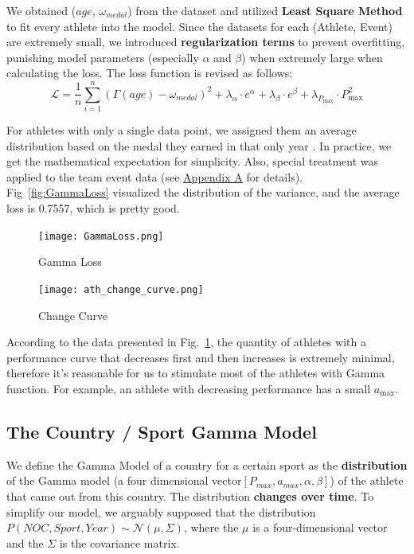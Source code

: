 \documentclass{mcmthesis}
\begin{document}
We obtained ($age$, $\omega_{medal}$) from the dataset and utilized \textbf{Least Square Method} to fit every athlete into the model. Since the datasets for each (Athlete, Event) are extremely small, we introduced \textbf{regularization terms} to prevent overfitting, punishing model parameters (especially $\alpha$ and $\beta$) when extremely large when calculating the loss. The loss function is revised as follows:
\[
\mathcal{L} = \frac{1}{n} \sum_{i=1}^n (\Gamma(age) - \omega_{medal})^2 + \lambda_\alpha \cdot e^{\alpha} + \lambda_\beta \cdot e^{\beta} + \lambda_{P_{\text{max}}} \cdot P_{\text{max}}^2
\]

For athletes with only a single data point, we assigned them an average distribution based on the medal they earned in that only year . In practice, we get the mathematical expectation for simplicity. Also, special treatment was applied to the team event data (see \hyperref[appA]{Appendix A} for details). Fig~\ref{fig:GammaLoss} visualized the distribution of the variance, and the average loss is 0.7557, which is pretty good.


\begin{figure}[htbp]
    \centering
    \begin{minipage}{0.48\textwidth}
        \centering
        \texttt{[image: GammaLoss.png]}
        \caption{Gamma Loss}
        \label{GammaLoss}
    \end{minipage}
    \hfill
    \begin{minipage}{0.48\textwidth}
        \centering
        \texttt{[image: ath\_change\_curve.png]}
        \caption{Change Curve}
        \label{ChangeCurve}
    \end{minipage}
\end{figure}

According to the data presented in Fig.~\ref{ChangeCurve}, the quantity of athletes with a performance curve that decreases first and then increases is extremely minimal, therefore it's reasonable for us to stimulate most of the athletes with Gamma function. For example, an athlete with decreasing performance has a small $a_{\text{max}}$.

\subsection{The Country / Sport Gamma Model}
\label{sec:4.2}
We define the Gamma Model of a country for a certain sport as the \textbf{distribution} of the Gamma model (a four dimensional vector$[P_{max}, a_{max}, \alpha, \beta]$) of the athlete that came out from this country. The distribution \textbf{changes over time}. To simplify our model, we arguably supposed that the distribution $P(NOC, Sport, Year) \sim \mathcal{N}(\mu,\Sigma)$, where the $\mu$ is a four-dimensional vector and the $\Sigma$ is the covariance matrix.
\end{document}
